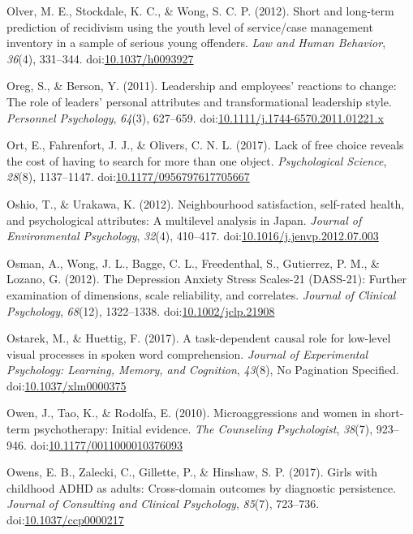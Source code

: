\documentclass[english,man]{apa6}
\begin{document}
\hypertarget{ref-Olver2012}{}
Olver, M. E., Stockdale, K. C., \& Wong, S. C. P. (2012). Short and
long-term prediction of recidivism using the youth level of service/case
management inventory in a sample of serious young offenders. \emph{Law
and Human Behavior}, \emph{36}(4), 331--344.
doi:\href{https://doi.org/10.1037/h0093927}{10.1037/h0093927}

\hypertarget{ref-Oreg2011}{}
Oreg, S., \& Berson, Y. (2011). Leadership and employees' reactions to
change: The role of leaders' personal attributes and transformational
leadership style. \emph{Personnel Psychology}, \emph{64}(3), 627--659.
doi:\href{https://doi.org/10.1111/j.1744-6570.2011.01221.x}{10.1111/j.1744-6570.2011.01221.x}

\hypertarget{ref-Ort2017}{}
Ort, E., Fahrenfort, J. J., \& Olivers, C. N. L. (2017). Lack of free
choice reveals the cost of having to search for more than one object.
\emph{Psychological Science}, \emph{28}(8), 1137--1147.
doi:\href{https://doi.org/10.1177/0956797617705667}{10.1177/0956797617705667}

\hypertarget{ref-Oshio2012}{}
Oshio, T., \& Urakawa, K. (2012). Neighbourhood satisfaction, self-rated
health, and psychological attributes: A multilevel analysis in Japan.
\emph{Journal of Environmental Psychology}, \emph{32}(4), 410--417.
doi:\href{https://doi.org/10.1016/j.jenvp.2012.07.003}{10.1016/j.jenvp.2012.07.003}

\hypertarget{ref-Osman2012}{}
Osman, A., Wong, J. L., Bagge, C. L., Freedenthal, S., Gutierrez, P. M.,
\& Lozano, G. (2012). The Depression Anxiety Stress Scales-21 (DASS-21):
Further examination of dimensions, scale reliability, and correlates.
\emph{Journal of Clinical Psychology}, \emph{68}(12), 1322--1338.
doi:\href{https://doi.org/10.1002/jclp.21908}{10.1002/jclp.21908}

\hypertarget{ref-Ostarek2017}{}
Ostarek, M., \& Huettig, F. (2017). A task-dependent causal role for
low-level visual processes in spoken word comprehension. \emph{Journal
of Experimental Psychology: Learning, Memory, and Cognition},
\emph{43}(8), No Pagination Specified.
doi:\href{https://doi.org/10.1037/xlm0000375}{10.1037/xlm0000375}

\hypertarget{ref-Owen2010}{}
Owen, J., Tao, K., \& Rodolfa, E. (2010). Microaggressions and women in
short-term psychotherapy: Initial evidence. \emph{The Counseling
Psychologist}, \emph{38}(7), 923--946.
doi:\href{https://doi.org/10.1177/0011000010376093}{10.1177/0011000010376093}

\hypertarget{ref-Owens2017a}{}
Owens, E. B., Zalecki, C., Gillette, P., \& Hinshaw, S. P. (2017). Girls
with childhood ADHD as adults: Cross-domain outcomes by diagnostic
persistence. \emph{Journal of Consulting and Clinical Psychology},
\emph{85}(7), 723--736.
doi:\href{https://doi.org/10.1037/ccp0000217}{10.1037/ccp0000217}
\end{document}
